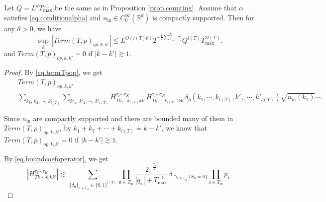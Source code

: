 \begin{lem}\label{lem.Tpvarianceop} Let $Q=L^dT^{-1}_{\text{max}}$ be the same as in Proposition \ref{prop.counting}. Assume that $\alpha$ satisfies \eqref{eq.conditionalpha} and $n_{\mathrm{in}} \in C^\infty_0(\mathbb{R}^d)$ is compactly supported. Then for any $\theta>0$, we have
\begin{equation}
    \sup_k\, |Term(T, p)_{op,k,k
    '}|\le L^{O(l(T)\theta)}2^{-\frac{1}{2}\sum_{j=1}^K \tau_{j}} Q^{l(T)} T_{\text{max}}^{2l(T)}.
\end{equation}
and $Term(T, p)_{op,k,k
    '}=0$ if $|k-k'|\gtrsim 1$.
\end{lem}
\begin{proof} By \eqref{eq.termTpop}, we get
\begin{equation}
\begin{split}
    &Term(T, p)_{op,k,k
    '}
    \\
    =&\sum_{k_1,\, k_2,\, \cdots,\, k_{l(T)}}\sum_{k'_1,\, k'_2,\, \cdots,\, k'_{l(T)}} H^{\tau_1\cdots \tau_{K}}_{Tk_1\cdots k_{l(T)}kk'} \overline{H^{\tau_1\cdots \tau_{K}}_{Tk_1'\cdots k_{l(T)}'kk'}} \delta_{p}(k_1,\cdots, k_{l(T)}, k'_1,\cdots, k'_{l(T)})\sqrt{n_{\textrm{in}}(k_1)}\cdots.
\end{split}
\end{equation}

Since $n_{\mathrm{in}}$ are compactly supported and there are bounded many of them in $Term(T, p)_{op,k,k'}$, by $k_1 + k_2 + \cdots + k_{l(T)}=k-k'$, we know that $Term(T, p)_{op,k,k'}=0$ if $|k-k'|\gtrsim 1$.

By \eqref{eq.boundcoefoperator}, we get  %
\begin{equation}\label{eq.termlemmaeq1op}
    |H^{\tau_1\cdots \tau_{K}}_{Tk_1\cdots k_{l}kk'}|\lesssim \sum_{\{d_{\mathfrak{n}}\}_{\mathfrak{n}\in T_{\text{in}}}\in\{0,1\}^{l(T)}}\prod_{\mathfrak{n}\in T_{\text{in}}}\frac{2^{-\frac{\tau_{\mathfrak{n}}}{2}}}{|q_{\mathfrak{n}}|+T^{-1}_{\text{max}}}\ \delta_{\cap_{\mathfrak{n}\in T_{\text{in}}} \{S_{\mathfrak{n}}=0\}}\prod_{\mathfrak{e}\in T_{\text{in}}} p_{\mathfrak{e}}.
\end{equation}


\end{proof}
